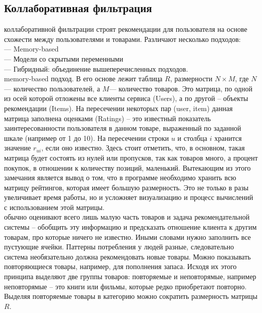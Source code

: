 \documentclass{article}
\newcommand\tab[1][1cm]{\hspace*{#1}}
\begin{document}
\subsection{Коллаборативная фильтрация}
 коллаборативной фильтрации строят рекомендации для пользователя на основе схожести между пользователями и товарами. Различают несколько подходов:\\
\tab— Memory-based\\
\tab— Модели со скрытыми переменными\\
\tab— Гибридный: объединение вышеперечисленных подходов.\\
 memory-based подход. В его основе лежит таблица $R$, ﻿размерности $N\times M$, где ﻿$N$﻿ — количество пользователей, а $M$— количество товаров. Это матрица, по одной из осей которой отложены все клиенты сервиса (Users), а по другой – объекты рекомендации (Items). На пересечении некоторых пар (user, item) данная матрица заполнена оценками (Ratings) – это известный показатель заинтересованности пользователя в данном товаре, выраженный по заданной шкале (например от 1 до 10). На пересечении строки $u$ и столбца ﻿$i$﻿ хранится значение ﻿$r_{ui}$﻿, если оно известно. Здесь стоит отметить, что, в основном, такая матрица будет состоять из нулей или пропусков, так как товаров много, а процент покупок, в отношении к количеству позиций, маленький. Вытекающим из этого замечания является вывод о том, что в программе необходимо хранить всю матрицу рейтингов, которая имеет большую размерность. Это не только в разы увеличивает время работы, но и усложняет визуализацию и процесс вычислений с использованием этой матрицы. \\
 обычно оценивают всего лишь малую часть товаров и задача рекомендательной системы – обобщить эту информацию и предсказать отношение клиента к другим товарам, про которые ничего не известно. Иными словами нужно заполнить все пустующие ячейки. Паттерны потребления у людей разные, следовательно система необязательно должна рекомендовать новые товары. Можно показывать повторяющиеся товары, например, для пополнения запаса. Исходя их этого принципа выделяют две группы товаров: повторяемые и неповторямые, например неповторямые – это книги или фильмы, которые редко приобретают повторно. Выделяя повторяемые товары в категорию можно сократить размерность матрицы $R$.\\
\end{document}
